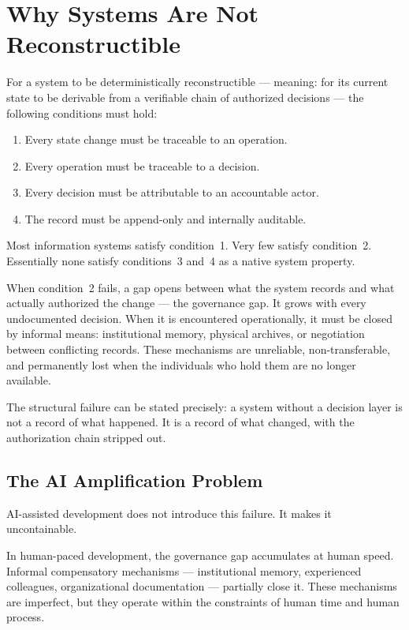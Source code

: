 \documentclass[conference]{IEEEtran}
\begin{document}
\section{Why Systems Are Not Reconstructible}

For a system to be deterministically reconstructible --- meaning: for its current state to be derivable from a verifiable chain of authorized decisions --- the following conditions must hold:

\begin{enumerate}
  \item Every state change must be traceable to an operation.
  \item Every operation must be traceable to a decision.
  \item Every decision must be attributable to an accountable actor.
  \item The record must be append-only and internally auditable.
\end{enumerate}

Most information systems satisfy condition~1. Very few satisfy condition~2. Essentially none satisfy conditions~3 and~4 as a native system property.

When condition~2 fails, a gap opens between what the system records and what actually authorized the change --- the governance gap. It grows with every undocumented decision. When it is encountered operationally, it must be closed by informal means: institutional memory, physical archives, or negotiation between conflicting records. These mechanisms are unreliable, non-transferable, and permanently lost when the individuals who hold them are no longer available.

The structural failure can be stated precisely: a system without a decision layer is not a record of what happened. It is a record of what changed, with the authorization chain stripped out.

\subsection{The AI Amplification Problem}

AI-assisted development does not introduce this failure. It makes it uncontainable.

In human-paced development, the governance gap accumulates at human speed. Informal compensatory mechanisms --- institutional memory, experienced colleagues, organizational documentation --- partially close it. These mechanisms are imperfect, but they operate within the constraints of human time and human process.
\end{document}
